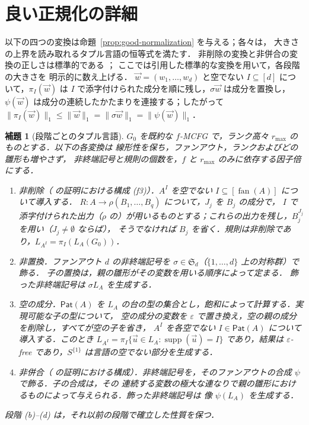 \documentclass[11pt,a4paper]{ltjsarticle}
\numberwithin{equation}{section}
\theoremstyle{plain}
\newtheorem{lemma}[theorem]{補題}
\theoremstyle{definition}
\theoremstyle{remark}
\newcommand{\tuple}[1]{\vec{#1}}
\newcommand{\eps}{\varepsilon}
\newcommand{\fan}{\operatorname{fan}}
\theoremstyle{plain}
\begin{document}
\section{良い正規化の詳細}
\label{app:normalization-details}

以下の四つの変換は命題~\ref{prop:good-normalization} を与える；各々は，
大きさの上界を読み取れるタプル言語の恒等式を満たす．
非削除の変換と非併合の変換の正しさは標準的である
\cite{SekiEtAl1991,Kanazawa2019Ogden,Yoshinaka2011}；
ここでは引用した標準的な変換を用いて，各段階の大きさを
明示的に数え上げる．
$\tuple w=(w_1,\ldots,w_d)$ と空でない $I\subseteq[d]$ について，$\pi_I(\tuple w)$ は
$I$ で添字付けられた成分を順に残し，$\sigma\tuple w$ は成分を置換し，
$\psi(\tuple w)$ は成分の連続したかたまりを連接する；したがって
$\|\pi_I(\tuple w)\|_1\le\|\tuple w\|_1=\|\sigma\tuple w\|_1=\|\psi(\tuple w)\|_1$．

\begin{lemma}[段階ごとのタプル言語]
\label{lem:normalization-stages}
$G_0$ を既約な $f$-MCFG で，ランク高々 $r_{\max}$ のものとする．以下の各変換は
線形性を保ち，ファンアウト，ランクおよびどの雛形も増やさず，
非終端記号と規則の個数を，$f$ と $r_{\max}$ のみに依存する因子倍にする．
\begin{enumerate}[label=\textup{(\alph*)},leftmargin=*]
\item \emph{非削除}（
\cite[Lemma~2.2]{SekiEtAl1991} の証明における構成 (f3)）．$A^I$ を空でない $I\subseteq[\fan(A)]$ について導入する．
$R:A\to\rho(B_1,\ldots,B_q)$ について，$J_j$ を $B_j$ の成分で，
$I$ で添字付けられた出力（$\rho$ の）が用いるものとする；これらの出力を残し，$B_j^{J_j}$ を用い（$J_j\ne\emptyset$ ならば），
そうでなければ $B_j$ を省く．規則は非削除であり，$L_{A^I}=\pi_I(L_A(G_0))$．
\item \emph{非置換．}ファンアウト $d$ の非終端記号を
$\sigma\in\mathfrak S_d$（$\{1,\ldots,d\}$ 上の対称群）で飾る．
子の置換は，親の雛形がその変数を用いる順序によって定まる．
飾った非終端記号は $\sigma L_A$ を生成する．
\item \emph{空の成分．}$\mathsf{Pat}(A)$ を
$L_A$ の台の型の集合とし，飽和によって計算する．実現可能な子の型について，
空の成分の変数を $\eps$ で置き換え，空の親の成分を削除し，すべてが空の子を省き，
$A^I$ を各空でない $I\in\mathsf{Pat}(A)$ について導入する．このとき
$L_{A^I}=\pi_I\{\tuple u\in L_A:\operatorname{supp}(\tuple u)=I\}$ であり，結果は
$\eps$-free であり，$S^{\{1\}}$ は言語の空でない部分を生成する．
\item \emph{非併合}（
\cite[Section~2.3, Lemma~1]{Yoshinaka2011} の証明における構成）．非終端記号を，そのファンアウトの合成
$\psi$ で飾る．子の合成は，その
連続する変数の極大な連なりで親の雛形におけるものによって与えられる．飾った非終端記号は
像 $\psi(L_A)$ を生成する．
\end{enumerate}
段階 (b)--(d) は，それ以前の段階で確立した性質を保つ．
\end{lemma}
\end{document}
